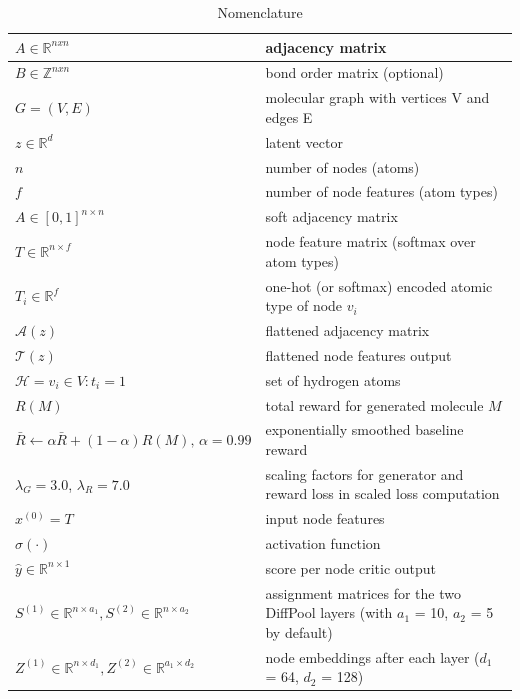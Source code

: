 \documentclass[conference]{IEEEtran}
\begin{document}
\begin{table}[H]
    \centering
    \caption*{Nomenclature}
    \begin{tabular}{p{4cm} | p{4cm}}
        \hline
        $A \in \mathbb{R}^{nxn}$ & adjacency matrix \\
        \hline
        $B \in \mathbb{Z}^{nxn}$ & bond order matrix (optional) \\
        \hline
        $G = (V, E)$ & molecular graph with vertices V and edges E \\
        \hline
        $z \in \mathbb{R}^d$ & latent vector \\
        \hline
        $n$ & number of nodes (atoms) \\
        \hline
        $f$ & number of node features (atom types) \\
        \hline
        $A \in [0, 1]^{n \times n}$ & soft adjacency matrix \\
        \hline
        $T \in \mathbb{R}^{n \times f}$ & node feature matrix (softmax over atom types) \\
        \hline
        $T_i \in \mathbb{R}^f$ & one-hot (or softmax) encoded atomic type of node $v_i$ \\
        \hline
        $\mathcal{A}(z)$ & flattened adjacency matrix \\
        \hline
        $\mathcal{T}(z)$ & flattened node features output \\
        \hline
        $\mathcal{H} = {v_i \in V \colon t_i = 1}$ & set of hydrogen atoms \\
        \hline
        $R(M)$ & total reward for generated molecule $M$ \\
        \hline
        $\bar{R} \leftarrow \alpha \bar{R} + (1 - \alpha)R(M) \text{, } \alpha = 0.99$ & exponentially smoothed baseline reward \\
        \hline
        $\lambda_G = 3.0$, $\lambda_R = 7.0$ & scaling factors for generator and reward loss in scaled loss computation \\
        \hline
        $x^{(0)} = T$ & input node features \\
        \hline
        $\sigma (\cdot)$ & activation function \\
        \hline
        $\hat{y} \in \mathbb{R}^{n \times 1}$ & score per node critic output \\
        \hline
        $S^{(1)} \in \mathbb{R}^{n \times a_1}, S^{(2)} \in \mathbb{R}^{n \times a_2}$ & assignment matrices for the two DiffPool layers (with $a_1$ = 10, $a_2$ = 5 by default) \\
        \hline
        $Z^{(1)} \in \mathbb{R}^{n \times d_1}, Z^{(2)} \in \mathbb{R}^{a_1 \times d_2}$ & node embeddings after each layer ($d_1$ = 64, $d_2$ = 128) \\
        \hline
    \end{tabular}
\end{table}
\end{document}
